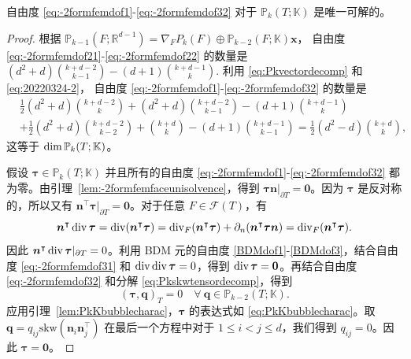 \begin{lemma}
自由度 \eqref{eq:-2formfemdof1}-\eqref{eq:-2formfemdof32} 对于 $\mathbb
P_k(T;\mathbb K)$ 是唯一可解的。 
\end{lemma}
\begin{proof}
根据 $\mathbb P_{k-1}(F;\mathbb R^{d-1})=\nabla_FP_k(F)\oplus\mathbb P_{k-2}(F;\mathbb K)\boldsymbol{x}$，
自由度 \eqref{eq:-2formfemdof21}-\eqref{eq:-2formfemdof22} 的数量是
$
(d^2+d){k+d-2\choose k-1} - (d+1){k+d-1\choose k}.
$
利用 \eqref{eq:Pkvectordecomp} 和 \eqref{eq:20220324-2}，
自由度 \eqref{eq:-2formfemdof1}-\eqref{eq:-2formfemdof32} 的数量是
\begin{align*}
&\frac{1}{2}(d^2+d){k+d-2\choose k} + (d^2+d){k+d-2\choose k-1} - (d+1){k+d-1\choose k} \\
&+ \frac{1}{2}(d^2+d){k+d-2\choose k-2}+{k+d\choose k}-(d+1){k+d-1\choose k-1} =\frac{1}{2}(d^2-d){k+d\choose k},
\end{align*}
这等于 $\operatorname{dim}\mathbb P_k(T;\mathbb K)$。

假设 $\boldsymbol{\tau}\in\mathbb P_k(T;\mathbb K)$ 并且所有的自由度
\eqref{eq:-2formfemdof1}-\eqref{eq:-2formfemdof32}
都为零。由引理~\ref{lem:-2formfemfaceunisolvence}，得到
$\boldsymbol{\tau}\boldsymbol{n}|_{\partial T}=\boldsymbol{0}$。因为
$\boldsymbol{\tau}$ 是反对称的，所以又有
$\boldsymbol{n}^{\intercal}\boldsymbol{\tau}|_{\partial
T}=\boldsymbol{0}$。对于任意 $F\in\mathcal F(T)$，有
\begin{equation}\label{eq:20220324-3}
\boldsymbol{n}^{\intercal}\operatorname{div}\boldsymbol{\tau}=\operatorname{div}(\boldsymbol{n}^{\intercal}\boldsymbol{\tau})= \operatorname{div}_F(\boldsymbol{n}^{\intercal}\boldsymbol{\tau})+\partial_n(\boldsymbol{n}^{\intercal}\boldsymbol{\tau}\boldsymbol{n})=\operatorname{div}_F(\boldsymbol{n}^{\intercal}\boldsymbol{\tau}).
\end{equation}
因此 $\boldsymbol{n}^{\intercal}\operatorname{div}\boldsymbol{\tau}|_{\partial
T}=0$。利用 BDM 元的自由度 \eqref{BDMdof1}-\eqref{BDMdof3}，结合自由度
\eqref{eq:-2formfemdof31} 和 $\operatorname{div}\operatorname{div}\boldsymbol{\tau}=0$，得到
$\operatorname{div}\boldsymbol{\tau}=\boldsymbol{0}$。再结合自由度
\eqref{eq:-2formfemdof32} 和分解 \eqref{eq:Pkskwtensordecomp}，得到
\[
(\boldsymbol{\tau}, \boldsymbol{q})_T=0  \quad \forall~\boldsymbol{q}\in \mathbb P_{k-2}(T;\mathbb K).
\]
应用引理~\ref{lem:PkKbubblecharac}，$\boldsymbol{\tau}$ 的表达式如 \eqref{eq:PkKbubblecharac}。取 $\boldsymbol{q}=q_{ij}\mathrm{skw}({\boldsymbol n_i\boldsymbol n_j^{\intercal}})$ 在最后一个方程中对于 $1\leq i<j\leq d$，我们得到 $q_{ij}=0$。因此 $\boldsymbol{\tau}=\boldsymbol{0}$。
\end{proof}

